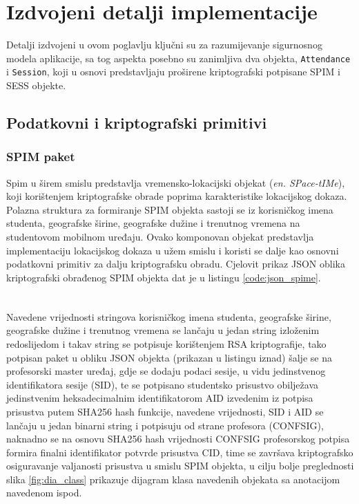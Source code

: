 \chapter{Izdvojeni detalji implementacije}
Detalji izdvojeni u ovom poglavlju ključni su za razumijevanje sigurnosnog modela aplikacije, sa tog aspekta posebno su zanimljiva dva objekta, \texttt{Attendance} i \texttt{Session}, koji u osnovi predstavljaju proširene kriptografski potpisane SPIM i SESS objekte.

\section{Podatkovni i kriptografski primitivi}
\subsection{SPIM paket}
Spim u širem smislu predstavlja vremensko-lokacijski objekat (\textit{en. SPace-tIMe}), koji korištenjem kriptografske obrade poprima karakteristike lokacijskog dokaza. Polazna struktura za formiranje SPIM objekta sastoji se iz korisničkog imena studenta, geografske širine, geografske dužine i trenutnog vremena na studentovom mobilnom uređaju. Ovako komponovan objekat predstavlja implementaciju lokacijskog dokaza u užem smislu i koristi se dalje kao osnovni podatkovni primitiv za dalju kriptografsku obradu. Cjelovit prikaz JSON oblika kriptografski obrađenog SPIM objekta dat je u listingu \ref{code:json_spime}.

\begin{code}
    \inputminted{text}{material/logit_tag.txt}
    \label{code:json_spime}
\end{code}

\paragraph*{}
Navedene vrijednosti stringova korisničkog imena studenta, geografske širine, geografske dužine i trenutnog vremena se lančaju u jedan string izloženim redoslijedom i takav string se potpisuje korištenjem RSA kriptografije, tako potpisan paket u obliku JSON objekta (prikazan u listingu iznad) šalje se na profesorski master uređaj, gdje se dodaju podaci sesije, u vidu jedinstvenog identifikatora sesije (SID), te se potpisano studentsko prisustvo obilježava jedinstvenim heksadecimalnim identifikatorom AID izvedenim iz potpisa prisustva putem SHA256 hash funkcije, navedene vrijednosti, SID i AID se lančaju u jedan binarni string i potpisuju od strane profesora (CONFSIG), naknadno se na osnovu SHA256 hash vrijednosti CONFSIG profesorskog potpisa formira finalni identifikator potvrde prisustva CID, time se završava kriptografsko osiguravanje valjanosti prisustva u smislu SPIM objekta, u cilju bolje preglednosti slika \ref{fig:dia_class} prikazuje dijagram klasa navedenih objekata sa anotacijom navedenom ispod.

